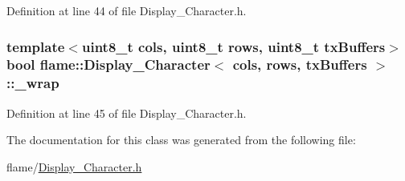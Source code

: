 Definition at line 44 of file Display\-\_\-\-Character.\-h.

\hypertarget{classflame_1_1_display___character_a2f51ff794dec405d8cdb42d470e9f31d}{
\subsubsection[{\-\_\-wrap}]{\setlength{\rightskip}{0pt plus 5cm}template$<$uint8\-\_\-t cols, uint8\-\_\-t rows, uint8\-\_\-t tx\-Buffers$>$ bool {\bf flame\-::\-Display\-\_\-\-Character}$<$ cols, rows, tx\-Buffers $>$\-::\-\_\-wrap\hspace{0.3cm}{\ttfamily [protected]}}}\label{classflame_1_1_display___character_a2f51ff794dec405d8cdb42d470e9f31d}


Definition at line 45 of file Display\-\_\-\-Character.\-h.



The documentation for this class was generated from the following file\-:\begin{DoxyCompactItemize}
\item 
flame/\hyperlink{_display___character_8h}{Display\-\_\-\-Character.\-h}\end{DoxyCompactItemize}
